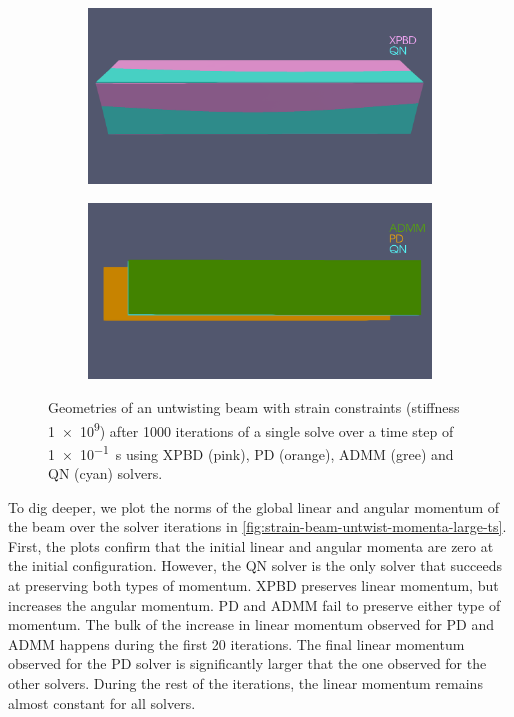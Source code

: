 \begin{figure}
    \centering
    \begin{subfigure}{0.49\textwidth}
        \includegraphics[width=\textwidth, trim={0 5.0cm 0 2.5cm}, clip]{figures/strain_beam_untwist_QN_vs_XPBD_large_ts.png}
    \end{subfigure}
    \hspace{0.001\textwidth}
    \begin{subfigure}{0.49\textwidth}
        \includegraphics[width=\textwidth, trim={0 4.5cm 0 2.15cm}, clip]{figures/strain_beam_untwist_QN_vs_ADMM_vs_PD_large_ts.png}
    \end{subfigure}
    \caption{Geometries of an untwisting beam with strain constraints (stiffness \num{1e9}) after 1000 iterations of a single solve over a time step 
        of \SI{1e-1}{\second} using XPBD (pink), PD (orange), ADMM (gree) and QN (cyan) solvers.}
    \label{fig:strain-beam-untwist-geometries-large-ts}
\end{figure}

To dig deeper, we plot the norms of the global linear and angular momentum of the beam over the solver iterations in 
\autoref{fig:strain-beam-untwist-momenta-large-ts}. First, the plots confirm that the initial linear and angular momenta are zero at the initial 
configuration. However, the QN solver is the only solver that succeeds at preserving both types of momentum. XPBD preserves linear momentum, 
but increases the angular momentum. PD and ADMM fail to preserve either type of momentum. The bulk of the 
increase in linear momentum observed for PD and ADMM happens during the first 20 iterations. The final linear momentum observed for the PD solver is 
significantly larger that the one observed for the other solvers. During the rest of the iterations, the linear momentum remains almost constant for all solvers. 


